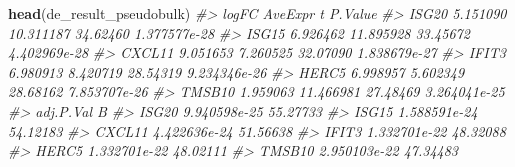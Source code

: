 \documentclass[
]{book}
\newenvironment{Shaded}{\begin{snugshade}}{\end{snugshade}}
\newcommand{\CommentTok}[1]{\textcolor[rgb]{0.56,0.35,0.01}{\textit{#1}}}
\newcommand{\FunctionTok}[1]{\textcolor[rgb]{0.13,0.29,0.53}{\textbf{#1}}}
\newcommand{\NormalTok}[1]{#1}
\begin{document}
\begin{Shaded}
\begin{Highlighting}[]
\FunctionTok{head}\NormalTok{(de\_result\_pseudobulk)}
\CommentTok{\#\textgreater{}           logFC   AveExpr        t      P.Value}
\CommentTok{\#\textgreater{} ISG20  5.151090 10.311187 34.62460 1.377577e{-}28}
\CommentTok{\#\textgreater{} ISG15  6.926462 11.895928 33.45672 4.402969e{-}28}
\CommentTok{\#\textgreater{} CXCL11 9.051653  7.260525 32.07090 1.838679e{-}27}
\CommentTok{\#\textgreater{} IFIT3  6.980913  8.420719 28.54319 9.234346e{-}26}
\CommentTok{\#\textgreater{} HERC5  6.998957  5.602349 28.68162 7.853707e{-}26}
\CommentTok{\#\textgreater{} TMSB10 1.959063 11.466981 27.48469 3.264041e{-}25}
\CommentTok{\#\textgreater{}           adj.P.Val        B}
\CommentTok{\#\textgreater{} ISG20  9.940598e{-}25 55.27733}
\CommentTok{\#\textgreater{} ISG15  1.588591e{-}24 54.12183}
\CommentTok{\#\textgreater{} CXCL11 4.422636e{-}24 51.56638}
\CommentTok{\#\textgreater{} IFIT3  1.332701e{-}22 48.32088}
\CommentTok{\#\textgreater{} HERC5  1.332701e{-}22 48.02111}
\CommentTok{\#\textgreater{} TMSB10 2.950103e{-}22 47.34483}
\end{Highlighting}
\end{Shaded}
\end{document}
